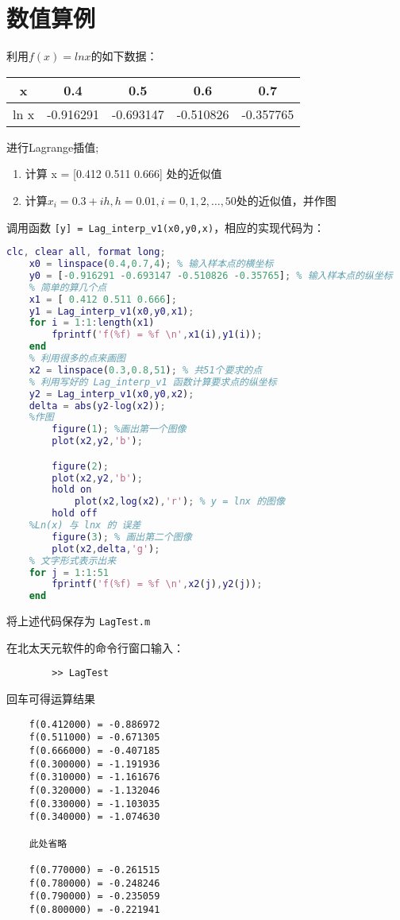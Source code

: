 \documentclass{xtupaper}
\begin{document}
	\section{数值算例}
	\begin{example}\label{exmJacobi1} 
利用$ f(x) = ln x $的如下数据：

\begin{center}%
	\begin{tabular}{|c|c|c|c|c|}
		\hline
		x & 0.4 & 0.5 & 0.6 & 0.7 \\
		\hline
		ln x  & -0.916291 & -0.693147 & -0.510826 & -0.357765 \\
		\hline
	\end{tabular}
\end{center}
进行Lagrange插值;
\begin{enumerate}
	\item 计算 x = [0.412 0.511 0.666] 处的近似值
	\item 计算$ x_i = 0.3 + ih,h=0.01,i = 0,1,2,\dots,50 $处的近似值，并作图

\end{enumerate}
	\end{example}
	
调用函数 \verb|[y] = Lag_interp_v1(x0,y0,x)|，相应的实现代码为：
	\begin{lstlisting}[language=matlab]
	clc, clear all, format long;
	x0 = linspace(0.4,0.7,4); % 输入样本点的横坐标
	y0 = [-0.916291 -0.693147 -0.510826 -0.35765]; % 输入样本点的纵坐标
	% 简单的算几个点
	x1 = [ 0.412 0.511 0.666];
	y1 = Lag_interp_v1(x0,y0,x1);
	for i = 1:1:length(x1)
		fprintf('f(%f) = %f \n',x1(i),y1(i));
	end
	% 利用很多的点来画图
	x2 = linspace(0.3,0.8,51); % 共51个要求的点
	% 利用写好的 Lag_interp_v1 函数计算要求点的纵坐标
	y2 = Lag_interp_v1(x0,y0,x2);
	delta = abs(y2-log(x2));
	%作图
		figure(1); %画出第一个图像
		plot(x2,y2,'b');

		figure(2);
		plot(x2,y2,'b');
		hold on
			plot(x2,log(x2),'r'); % y = lnx 的图像
		hold off
	%Ln(x) 与 lnx 的 误差 
		figure(3); % 画出第二个图像
		plot(x2,delta,'g');
	% 文字形式表示出来
	for j = 1:1:51
		fprintf('f(%f) = %f \n',x2(j),y2(j));
	end
	\end{lstlisting}
	将上述代码保存为 \verb|LagTest.m|
	
	在北太天元软件的命令行窗口输入：
	\begin{lstlisting}
		>> LagTest
	\end{lstlisting}
	回车可得运算结果
	\begin{lstlisting}
	f(0.412000) = -0.886972 
	f(0.511000) = -0.671305 
	f(0.666000) = -0.407185 
	f(0.300000) = -1.191936 
	f(0.310000) = -1.161676 
	f(0.320000) = -1.132046 
	f(0.330000) = -1.103035 
	f(0.340000) = -1.074630 
	
	此处省略

	f(0.770000) = -0.261515 
	f(0.780000) = -0.248246 
	f(0.790000) = -0.235059 
	f(0.800000) = -0.221941 
	\end{lstlisting}
	
\end{document}
